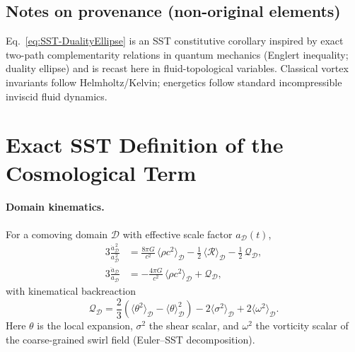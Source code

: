 \documentclass[10pt,reprint,aps,onecolumn,nofootinbib]{revtex4-2}
\newcommand{\rc}{r_c}                                    %
\providecommand{\rc}{r_c}
\newcommand{\rhoF}{\rho_{\!f}}     %
\begin{document}
    \subsection*{Notes on provenance (non-original elements)}
    Eq.~\eqref{eq:SST-DualityEllipse} is an SST constitutive corollary inspired by exact
    two-path complementarity relations in quantum mechanics (Englert inequality; duality ellipse)
    and is recast here in fluid-topological variables. Classical vortex invariants follow
    Helmholtz/Kelvin; energetics follow standard incompressible inviscid fluid dynamics.



    \providecommand{\rhoF}{\rho_{\!f}}
    \providecommand{\rc}{r_c}

    \section{Exact SST Definition of the Cosmological Term}
    \label{sec:SST-Lambda-exact}

    \paragraph{Domain kinematics.}
        For a comoving domain $\mathcal{D}$ with effective scale factor $a_\mathcal{D}(t)$,
        \begin{align}
            3\frac{\dot a_\mathcal{D}^{\,2}}{a_\mathcal{D}^{\,2}}
            &= \frac{8\pi G}{c^2}\,\langle \rho c^2 \rangle_\mathcal{D}
            - \tfrac{1}{2}\,\langle \mathcal{R} \rangle_\mathcal{D}
            - \tfrac{1}{2}\,\mathcal{Q}_\mathcal{D}, \tag{F1}\label{F1}\\
            3\frac{\ddot a_\mathcal{D}}{a_\mathcal{D}}
            &= -\frac{4\pi G}{c^2}\,\langle \rho c^2 \rangle_\mathcal{D}
            + \mathcal{Q}_\mathcal{D}, \tag{F2}\label{F2}
        \end{align}
        with kinematical backreaction
        \[
            \mathcal{Q}_\mathcal{D}
            = \frac{2}{3}\!\left(\langle \theta^{2}\rangle_\mathcal{D}-\langle \theta\rangle_\mathcal{D}^{2}\right)
            - 2\langle \sigma^{2}\rangle_\mathcal{D}
            + 2\langle \omega^{2}\rangle_\mathcal{D}.
        \]
        Here $\theta$ is the local expansion, $\sigma^2$ the shear scalar, and $\omega^2$ the vorticity scalar of the coarse-grained swirl field (Euler–SST decomposition).
\end{document}

